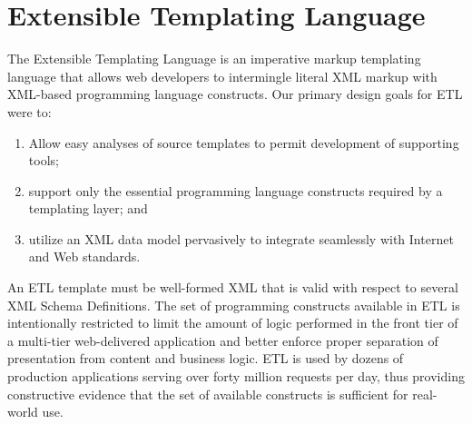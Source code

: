 \documentclass{www2003-submission}
\begin{document}





\section{\hspace*{-.1in}Extensible Templating Language}
\label{sec-etl}

The Extensible Templating Language is an imperative markup templating
language that allows web developers to intermingle literal XML markup
with XML-based programming language constructs.  Our primary design
goals for ETL were to:

\begin{enumerate}
\item Allow easy analyses of source templates to permit development of
supporting tools; 
\item support only the essential programming language constructs
required by a templating layer; and
\item utilize an XML data model pervasively to integrate seamlessly
with Internet and Web standards.
\end{enumerate}

An ETL template must be well-formed XML that is valid with respect to
several XML Schema Definitions.  The set of programming constructs
available in ETL is intentionally restricted to limit the amount of
logic performed in the front tier of a multi-tier web-delivered
application and better enforce proper separation of presentation from
content and business logic.  ETL is used by dozens of production
applications serving over forty million requests per day, thus
providing constructive evidence that the set of available constructs
is sufficient for real-world use.
\end{document}

